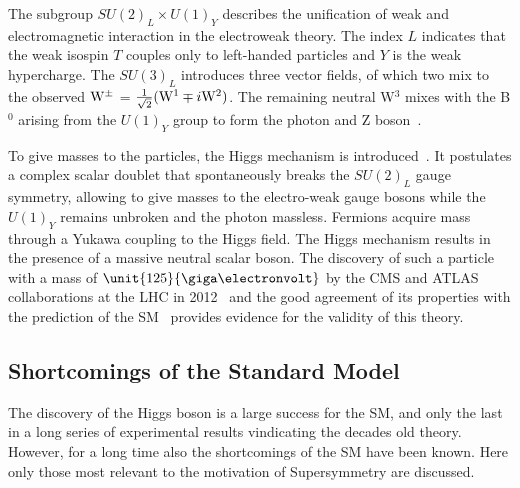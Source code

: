 The subgroup $SU(2)_L \times U(1)_Y$ describes the unification of weak and electromagnetic interaction in the electroweak theory. The index $L$ indicates that the weak isospin $T$ couples only to left-handed particles and $Y$ is the weak hypercharge. The $SU(3)_L$ introduces three vector fields, of which two mix to the observed $\mathrm{W}^{\pm}$ = $\frac{1}{\sqrt{2}}(\mathrm{W}^1\mp i\mathrm{W}^2)$. The remaining neutral W$^3$ mixes with the B$^0$ arising from the $U(1)_Y$ group to form the photon and Z boson~\cite{HalzenMartin}.

To give masses to the particles, the Higgs mechanism is introduced~\cite{PhysRevLett.13.508,PhysRevLett.13.321,PhysRevLett.13.585}. It postulates a complex scalar doublet that spontaneously breaks the $SU(2)_L$ gauge symmetry, allowing to give masses to the electro-weak gauge bosons while the $U(1)_Y$ remains unbroken and the photon massless. Fermions acquire mass through a Yukawa coupling to the Higgs field. The Higgs mechanism results in the presence of a massive neutral scalar boson. The discovery of such a particle with a mass of $\unit{125}{\giga\electronvolt}$ by the CMS and ATLAS collaborations at the LHC in 2012~\cite{Chatrchyan:2012ufa,Aad:2012tfa} and the good agreement of its properties with the prediction of the SM~\cite{Khachatryan:2014jba} provides evidence for the validity of this theory.   

\subsection*{Shortcomings of the Standard Model}
The discovery of the Higgs boson is a large success for the SM, and only the last in a long series of experimental results vindicating the decades old theory. However, for a long time also the shortcomings of the SM have been known. Here only those most relevant to the motivation of Supersymmetry are discussed.

